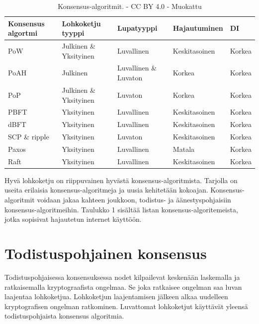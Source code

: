 \documentclass[utf8,bachelor]{gradu3}
\begin{document}
\begin{table}[ht]\centering
  \begin{tabular}{lllll}
    \toprule
    Konsensus algortmi & Lohkoketju tyyppi & Lupatyyppi & Hajautuminen & DI \\
    \midrule
    PoW     & Julkinen \& Yksityinen 
            & Luvallinen 
            & Keskitasoinen 
            & Korkea \\
            
    PoAH    & Julkinen 
            & Luvallinen \& Luvaton 
            & Korkea 
            & Korkea \\
            
    PoP     & Julkinen \& Yksityinen 
            & Luvaton
            & Korkea 
            & Korkea \\
    \midrule
    PBFT    & Yksityinen  
            & Luvallinen
            & Keskitasoinen 
            & Korkea \\
            
    dBFT    & Yksityinen  
            & Luvallinen 
            & Keskitasoinen 
            & Korkea \\
            
    SCP \& ripple   
            & Yksityinen  
            & Luvaton
            & Keskitasoinen 
            & Korkea \\
    \midrule
    Paxos
            & Yksityinen
            & Luvallinen
            & Matala
            & Korkea \\
    Raft
            & Yksityinen
            & Luvallinen
            & Keskitasoinen
            & Korkea \\

    \bottomrule
  \end{tabular}
  \caption{Konsensus-algoritmit. \cite{zarrin2021blockchain} - CC BY 4.0 - Muokattu}
  \label{tbl:cmdchange}
\end{table}

Hyvä lohkoketju on riippuvainen hyvästä konsensus-algoritmista.
Tarjolla on useita erilaisia konsensus-algoritmeja ja uusia kehitetään kokoajan. 
Konsensus-algoritmit voidaan jakaa kahteen joukkoon, todistus- ja äänestyspohjaisiin konsensus-algoritmeihin.
Taulukko 1 sisältää listan konsensus-algoritemeista, jotka sopisivat hajautetun internet käyttöön. 


\section{Todistuspohjainen konsensus}
Todistuspohjaisessa konsensuksessa nodet kilpailevat keskenään laskemalla ja ratkaisemalla kryptograafista ongelmaa. 
Se joka ratkaisee ongelman saa luvan laajentaa lohkoketjua.
Lohkoketjun laajentamisen jälkeen alkaa uudelleen kryptografisen ongelman ratkominen.
Luvattomat lohkoketjut käyttävät yleensä todistuspohjaista konsensus algoritmia.
\end{document}
